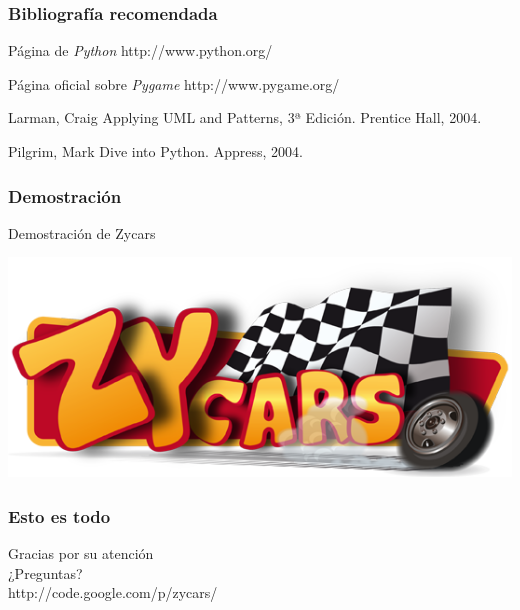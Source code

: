 \begin{frame}
    \frametitle{Bibliografía recomendada}
    \begin{thebibliography}{5}
        \beamertemplatearticlebibitems
            Página de \emph{Python}
            \newblock http://www.python.org/
            
            Página oficial sobre \emph{Pygame}
            \newblock http://www.pygame.org/
             
        \beamertemplatebookbibitems
            Larman, Craig
            \newblock Applying UML and Patterns, 3ª Edición. Prentice Hall, 2004.
            
            Pilgrim, Mark
            \newblock Dive into Python. Appress, 2004.
    \end{thebibliography}
\end{frame}

\begin{frame}
    \frametitle{Demostración}
    
    \begin{center}
        {\Huge Demostración de Zycars}
    \end{center}
    
    \begin{center}
        \includegraphics[scale=0.4]{imagenes/logo_zycars.png}
    \end{center}

\end{frame}

\begin{frame}
    \frametitle{Esto es todo}
    
    \begin{center}
        {\Huge Gracias por su atención}\\
        \bigskip
        {\huge ¿Preguntas?}\\
        \bigskip
        {\LARGE http://code.google.com/p/zycars/}
    \end{center}

\end{frame}
